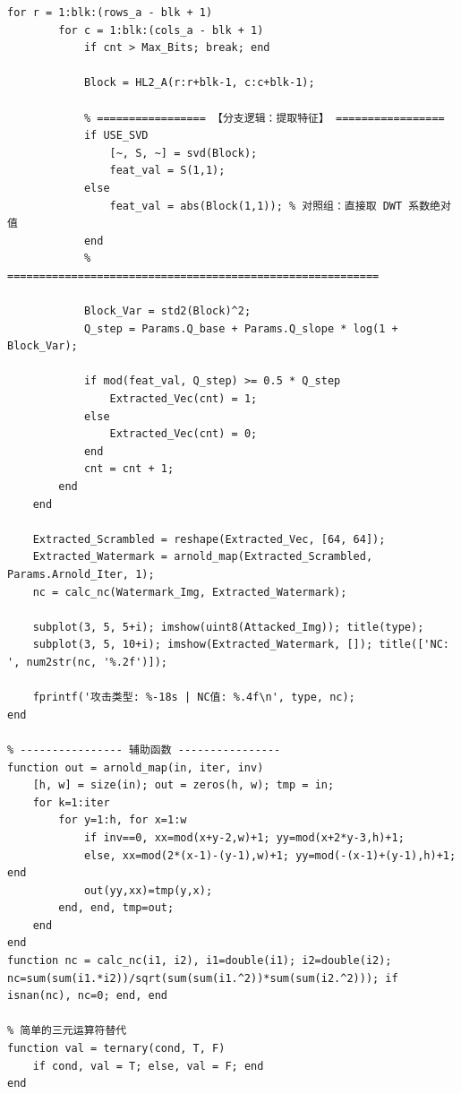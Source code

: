 \documentclass[zihao=-4, a4paper]{ctexart} %
\begin{document}
\begin{lstlisting}[caption={DWT-SVD 水印嵌入与提取完整代码}]
    for r = 1:blk:(rows_a - blk + 1)
        for c = 1:blk:(cols_a - blk + 1)
            if cnt > Max_Bits; break; end
            
            Block = HL2_A(r:r+blk-1, c:c+blk-1);
            
            % ================= 【分支逻辑：提取特征】 =================
            if USE_SVD
                [~, S, ~] = svd(Block);
                feat_val = S(1,1);
            else
                feat_val = abs(Block(1,1)); % 对照组：直接取 DWT 系数绝对值
            end
            % ==========================================================
            
            Block_Var = std2(Block)^2;
            Q_step = Params.Q_base + Params.Q_slope * log(1 + Block_Var);
            
            if mod(feat_val, Q_step) >= 0.5 * Q_step
                Extracted_Vec(cnt) = 1; 
            else
                Extracted_Vec(cnt) = 0; 
            end
            cnt = cnt + 1;
        end
    end
    
    Extracted_Scrambled = reshape(Extracted_Vec, [64, 64]);
    Extracted_Watermark = arnold_map(Extracted_Scrambled, Params.Arnold_Iter, 1);
    nc = calc_nc(Watermark_Img, Extracted_Watermark);
    
    subplot(3, 5, 5+i); imshow(uint8(Attacked_Img)); title(type);
    subplot(3, 5, 10+i); imshow(Extracted_Watermark, []); title(['NC: ', num2str(nc, '%.2f')]);
    
    fprintf('攻击类型: %-18s | NC值: %.4f\n', type, nc);
end

% ---------------- 辅助函数 ----------------
function out = arnold_map(in, iter, inv)
    [h, w] = size(in); out = zeros(h, w); tmp = in;
    for k=1:iter
        for y=1:h, for x=1:w
            if inv==0, xx=mod(x+y-2,w)+1; yy=mod(x+2*y-3,h)+1;
            else, xx=mod(2*(x-1)-(y-1),w)+1; yy=mod(-(x-1)+(y-1),h)+1; end
            out(yy,xx)=tmp(y,x);
        end, end, tmp=out;
    end
end
function nc = calc_nc(i1, i2), i1=double(i1); i2=double(i2); nc=sum(sum(i1.*i2))/sqrt(sum(sum(i1.^2))*sum(sum(i2.^2))); if isnan(nc), nc=0; end, end

% 简单的三元运算符替代
function val = ternary(cond, T, F)
    if cond, val = T; else, val = F; end
end
	\end{lstlisting}
	
\end{document}
